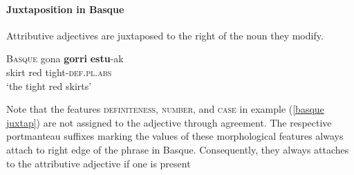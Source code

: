 \paragraph{Juxtaposition in Basque}
Attributive adjectives are juxtaposed to the right of the noun they modify.
\begin{exe}
\ex \textsc{Basque} \citep[81]{saltarelli1988} \label{basque juxtap}
\gll	gona \textbf{gorri} \textbf{estu}-ak\\
	skirt red tight-\textsc{def.pl.abs}\\
\glt	‘the tight red skirts’
\end{exe}
Note that the features \textsc{definiteness}, \textsc{number}, and \textsc{case} in example (\ref{basque juxtap}) are not assigned to the adjective through agreement. The respective portmanteau suffixes marking the values of these morphological features always attach to right edge of the phrase in Basque. Consequently, they always attaches to the attributive adjective if one is present \cite[171]{hualde-etal2003}
